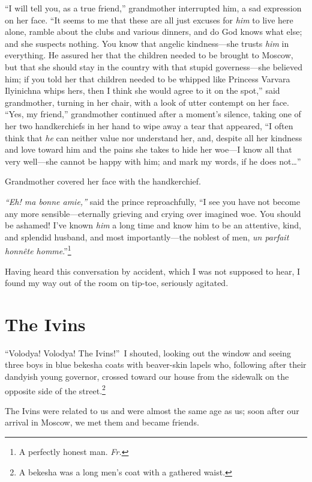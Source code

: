 ``I will tell you, as a true friend,'' grandmother interrupted him, a sad expression on her face. ``It seems to me that these are all just excuses for \emph{him} to live here alone, ramble about the clubs and various dinners, and do God knows what else; and she suspects nothing. You know that angelic kindness---she trusts \emph{him} in everything. He assured her that the children needed to be brought to Moscow, but that she should stay in the country with that stupid governess---she believed him; if you told her that children needed to be whipped like Princess Varvara Ilyinichna whips hers, then I think she would agree to it on the spot,'' said grandmother, turning in her chair, with a look of utter contempt on her face. ``Yes, my friend,'' grandmother continued after a moment's silence, taking one of her two handkerchiefs in her hand to wipe away a tear that appeared, ``I often think that \emph{he} can neither value nor understand her, and, despite all her kindness and love toward him and the pains she takes to hide her woe---I know all that very well---she cannot be happy with him; and mark my words, if he does not\ldots{}'' %

Grandmother covered her face with the handkerchief.

\textit{``Eh! ma bonne amie,''} said the prince reproachfully, ``I see you have not become any more sensible---eternally grieving and crying over imagined woe. You should be ashamed! I've known \emph{him} a long time and know him to be an attentive, kind, and splendid husband, and most importantly---the noblest of men, \textit{un parfait honn\^ete homme}.''\footnote{A perfectly honest man. \textit{Fr.}} %

Having heard this conversation by accident, which I was not supposed to hear, I found my way out of the room on tip-toe, seriously agitated.

\chapter{The Ivins} %

``Volodya! Volodya! The Ivins!''~I shouted, looking out the window and seeing three boys in blue bekesha coats with beaver-skin lapels who, following after their dandyish young governor, crossed toward our house from the sidewalk on the opposite side of the street.\footnote{A bekesha was a long men's coat with a gathered waist.}

The Ivins were related to us and were almost the same age as us; soon after our arrival in Moscow, we met them and became friends.

